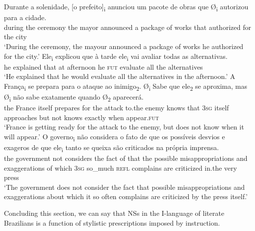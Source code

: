 \documentclass[output=paper,colorlinks,citecolor=brown]{langscibook}
\begin{document}
\ea\label{ex:03:kato:18} %
   \ea\label{ex:03:kato:18a}
 \gll Durante a   solenidade,  [o prefeito]\textsubscript{i} anunciou   um pacote   de obras  que Ø\textsubscript{i} autorizou  para a cidade. \\
            during  the ceremony    the mayor announced a    package of works that   {} authorized for the city\\
            \glt ‘During the ceremony, the mayour announced a package of works he authorized for the city.’
   \ex\label{ex:03:kato:18b}
 \gll  Ele\textsubscript{i} explicou que à tarde         ele\textsubscript{i} vai         avaliar        todas as alternativas. \\
            he explained that at afternoon he  \textsc{fut} evaluate  all    the alternatives\\
        \glt ‘He explained that he would evaluate all the alternatives in the afternoon.’
   \ex\label{ex:03:kato:18c}
 \gll A França\textsubscript{i}  se       prepara   para o ataque ao      inimigo\textsubscript{2}. Ø\textsubscript{i} Sabe    que ele\textsubscript{2}    se      aproxima, mas Ø\textsubscript{i} não sabe     exatamente quando Ø\textsubscript{2} aparecerá. \\
            the France itself  prepares for the attack    to.the enemy    {}      knows that 3\textsc{sg} itself approaches   but     {}  not  knows  exactly       when    {}     appear.\textsc{fut}\\
            \glt ‘France is getting ready for the attack to the enemy, but does not know when it will appear.’
   \ex\label{ex:03:kato:18d}
 \gll O governo\textsubscript{i}       não considera o    fato de que os possíveis desvios                  e     exageros de que    ele\textsubscript{i}   tanto       se queixa são criticados na      própria imprensa.\\
            the government not considers  the fact  of that the possible misappropriations and exaggerations of which 3\textsc{sg} so\_much  \textsc{refl} complains are criticized in.the very   press\\
            \glt ‘The government does not consider the fact that possible misappropriations and exaggerations about
            which it so often complains are criticized by the press itself.’

   \z

\z

Concluding this section, we can say that NSs in the I-language of literate Brazilians is a function of stylistic prescriptions imposed by instruction.
\end{document}
